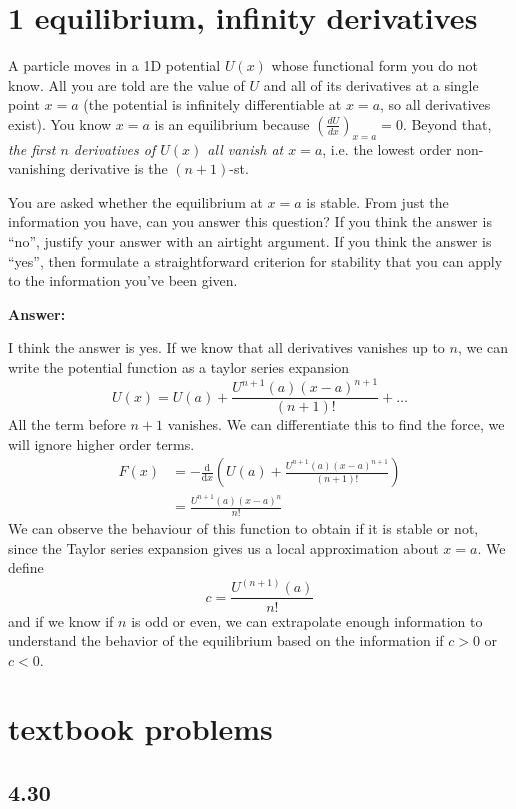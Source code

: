 \documentclass[12pt]{article}
\newcommand{\dydx}[2]{\frac{\text{d} #1}{\text{d} #2}}
\newcommand{\paren}[1]{\left( #1 \right)}
\begin{document}
\section{1 equilibrium, infinity derivatives}

A particle moves in a 1D potential \(U(x)\) whose functional form you do not know. All you are told are the value of \(U\) and all of its derivatives at a single point \(x = a\) (the potential is infinitely differentiable at \(x = a\), so all derivatives exist). You know \(x = a\) is an equilibrium because \(\left(\frac{dU}{dx}\right)_{x=a} = 0\). Beyond that, \textit{the first \(n\) derivatives of \(U(x)\) all vanish at \(x = a\)}, i.e. the lowest order non-vanishing derivative is the \((n+1)\)-st.

You are asked whether the equilibrium at \(x = a\) is stable. From just the information you have, can you answer this question? If you think the answer is “no”, justify your answer with an airtight argument. If you think the answer is “yes”, then formulate a straightforward criterion for stability that you can apply to the information you've been given.

\textbf{Answer:}

I think the answer is yes. If we know that all derivatives vanishes up to $n$, we can write the potential function as a taylor series expansion
\[
U(x) = U(a) + \frac{U^{n+1}(a)(x-a)^{n+1}}{(n+1)!} + \ldots
\]
All the term before $n+1$ vanishes. We can differentiate this to find the force, we will ignore higher order terms. 
\begin{align*}
F(x)&= -\dydx{}{x}\paren{U(a) + \frac{U^{n+1}(a)(x-a)^{n+1}}{(n+1)!}}\\
    &= \frac{U^{n+1}(a)(x-a)^{n}}{n!}
\end{align*}
We can observe the behaviour of this function to obtain if it is stable or not, since the Taylor series expansion gives us a local approximation about $x=a$. We define
\[
c = \frac{U^{(n+1)}(a)}{n!}
\]
and if we know if $n$ is odd or even, we can extrapolate enough information to understand the behavior of the equilibrium based on the information if $c >0$ or $c<0$.




\section{textbook problems}

\subsection{4.30}
\end{document}
